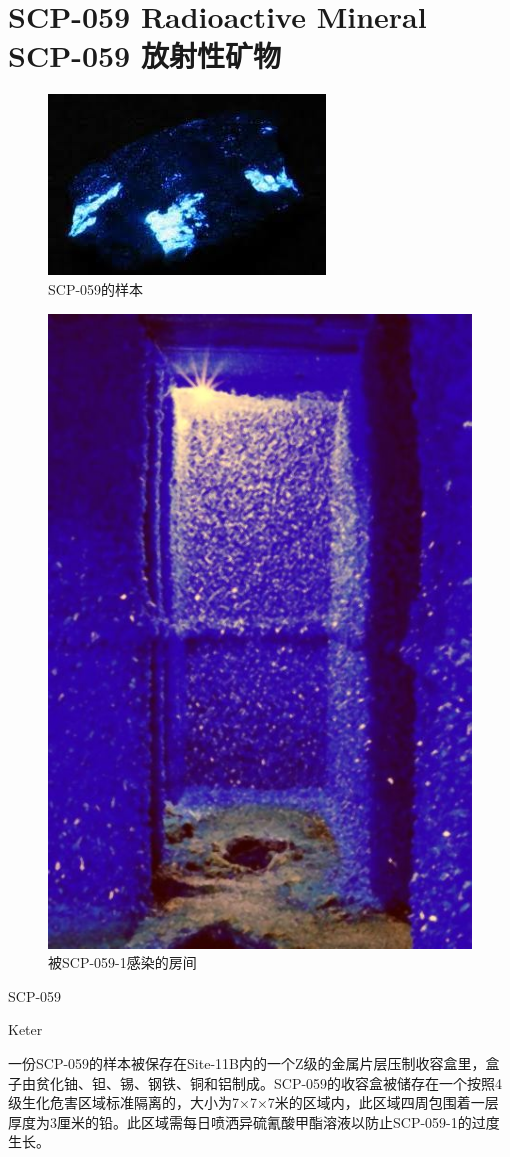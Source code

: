 \chapter[SCP-059 放射性矿物]{
    SCP-059 Radioactive Mineral\\
    SCP-059 放射性矿物
}

\label{chap:SCP-059}

\begin{figure}[H]
    \centering
    \includegraphics[width=0.5\linewidth]{images/SCP-059.jpg}
    \caption*{SCP-059的样本}
\end{figure}

\begin{figure}[H]
    \centering
    \includegraphics[width=0.5\linewidth]{images/SCP-059-2.jpg}
    \caption*{被SCP-059-1感染的房间}
\end{figure}

SCP-059

Keter

一份SCP-059的样本被保存在Site-11B内的一个Z级的金属片层压制收容盒里，盒子由贫化铀、钽、锡、钢铁、铜和铝制成。SCP-059的收容盒被储存在一个按照4级生化危害区域标准隔离的，大小为7×7×7米的区域内，此区域四周包围着一层厚度为3厘米的铅。此区域需每日喷洒异硫氰酸甲酯溶液以防止SCP-059-1的过度生长。


